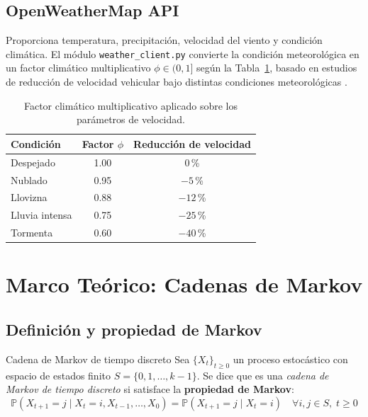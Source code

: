 \documentclass[11pt,a4paper]{article}
\begin{document}
\subsection{OpenWeatherMap API}

Proporciona temperatura, precipitación, velocidad del viento y condición climática. El módulo \texttt{weather\_client.py} convierte la condición meteorológica en un factor climático multiplicativo $\phi \in (0, 1]$ según la Tabla~\ref{tab:clima}, basado en estudios de reducción de velocidad vehicular bajo distintas condiciones meteorológicas \cite{vanlint2010}.

\begin{table}[H]
\centering
\small
\begin{tabular}{@{}lcc@{}}
\toprule
\textbf{Condición} & \textbf{Factor $\phi$} & \textbf{Reducción de velocidad} \\
\midrule
Despejado & 1.00 & 0\,\% \\
Nublado & 0.95 & $-5$\,\% \\
Llovizna & 0.88 & $-12$\,\% \\
Lluvia intensa & 0.75 & $-25$\,\% \\
Tormenta & 0.60 & $-40$\,\% \\
\bottomrule
\end{tabular}
\caption{Factor climático multiplicativo aplicado sobre los parámetros de velocidad.}
\label{tab:clima}
\end{table}

\section{Marco Teórico: Cadenas de Markov}

\subsection{Definición y propiedad de Markov}

\begin{defbox}{Cadena de Markov de tiempo discreto}
Sea $\{X_t\}_{t \geq 0}$ un proceso estocástico con espacio de estados finito $S = \{0, 1, \ldots, k-1\}$. Se dice que es una \textit{cadena de Markov de tiempo discreto} si satisface la \textbf{propiedad de Markov}:
\begin{equation}
\mathbb{P}(X_{t+1} = j \mid X_t = i, X_{t-1}, \ldots, X_0) = \mathbb{P}(X_{t+1} = j \mid X_t = i) \quad \forall i,j \in S, \; t \geq 0
\label{eq:markov}
\end{equation}
\end{defbox}
\end{document}
